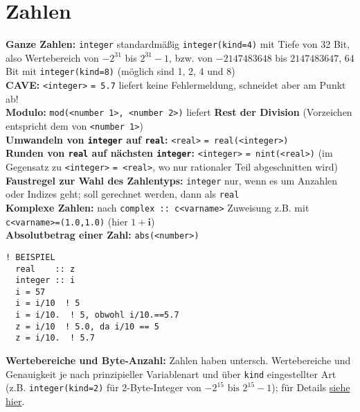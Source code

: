 \documentclass[a4paper, twocolumn]{scrarticle}
\begin{document}
\section{Zahlen}
\textbf{Ganze Zahlen:} \lstinline|integer| standardmäßig \lstinline|integer(kind=4)| mit Tiefe von 32 Bit, also Wertebereich von $-2^{31}$ bis $2^{31}-1$, bzw. von $-2147483648$ bis $2147483647$, 64 Bit mit \lstinline|integer(kind=8)| (möglich sind 1, 2, 4 und 8)\\
\textbf{CAVE:} \lstinline|<integer>| \lstinline|= 5.7| liefert keine Fehlermeldung, schneidet aber am Punkt ab!\\
\textbf{Modulo:} \lstinline|mod(<number 1>, <number 2>)| liefert \textbf{Rest der Division} (Vorzeichen entspricht dem von \lstinline|<number 1>|) \\
\textbf{Umwandeln von \lstinline|integer| auf \lstinline|real|:} \lstinline|<real>| \lstinline|= real(<integer>)|\\
\textbf{Runden von \lstinline|real| auf nächsten \lstinline|integer|:} \lstinline|<integer>| \lstinline|= nint(<real>)| (im Gegensatz zu \lstinline|<integer>| \lstinline|= <real>|, wo nur rationaler Teil abgeschnitten wird)\\
\textbf{Faustregel zur Wahl des Zahlentyps:} \lstinline|integer| nur, wenn es um Anzahlen oder Indizes geht; soll gerechnet werden, dann als \lstinline|real|\\
\textbf{Komplexe Zahlen:} nach \lstinline|complex :: c<varname>| Zuweisung z.B. mit \lstinline|c<varname>=(1.0,1.0)| (hier $1+\textbf{i}$)\\
\textbf{Absolutbetrag einer Zahl:} \lstinline|abs(<number>)|
\begin{lstlisting}[caption={\bfseries Beispiel: CAVE - implizite Umwandlungen bei Division}]
  ! BEISPIEL
  real    :: z
  integer :: i
  i = 57
  i = i/10  ! 5
  i = i/10.  ! 5, obwohl i/10.==5.7
  z = i/10  ! 5.0, da i/10 == 5
  z = i/10.  ! 5.7
\end{lstlisting}
\textbf{Wertebereiche und Byte-Anzahl:} Zahlen haben untersch. Wertebereiche und Genauigkeit je nach prinzipieller Variablenart und über \lstinline|kind| eingestellter Art (z.B. \lstinline|integer(kind=2)| für 2-Byte-Integer von $-2^{15} \text{ bis } 2^{15}-1$); für Details \href{http://earth.uni-muenster.de/~joergs/doc/f90/unix-um/dfum_034.html}{siehe hier}.
\end{document}

